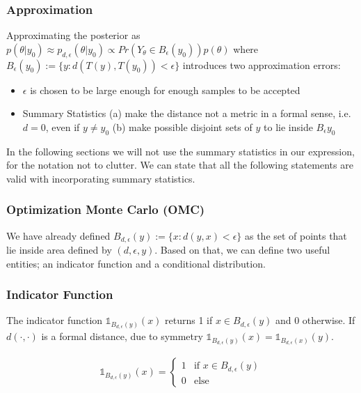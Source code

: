 \subsubsection{Approximation}

Approximating the posterior as $p(\theta|y_0) \approx p_{d,\epsilon}(\theta|y_0) \propto Pr(Y_\theta \in B_\epsilon(y_0))p(\theta)$ where $B_\epsilon(y_0) := \{y: d(T(y), T(y_0)) < \epsilon \}$ introduces two approximation errors:

\begin{itemize}
\item $\epsilon$ is chosen to be large enough for enough samples to be accepted
  \item Summary Statistics (a) make the distance not a metric in a formal sense, i.e. $d = 0$, even if $y \neq y_0$ (b) make possible disjoint sets of $y$ to lie inside $B_\epsilon{y_0}$
  \end{itemize}

  In the following sections we will not use the summary statistics in our expression, for the notation not to clutter. We can state that all the following statements are valid with incorporating summary statistics.
  
  \subsubsection{Optimization Monte Carlo (OMC)}

  We have already defined $B_{d,\epsilon}(y) := \{x: d(y,x)<\epsilon\}$ as the set of points that lie inside area defined by $(d, \epsilon, y)$. Based on that, we can define two useful entities; an indicator function and a conditional distribution.

  \subsubsection*{Indicator Function}

The indicator function $\mathbb{1}_{B_{d,\epsilon}(y)}(x)$ returns 1 if $x \in B_{d,\epsilon}(y)$ and 0 otherwise. If $d(\cdot,\cdot)$ is a formal distance, due to symmetry $\mathbb{1}_{B_{d,\epsilon}(y)}(x) = \mathbb{1}_{B_{d,\epsilon}(x)}(y)$.

\begin{gather} \label{eq:indicator}
  \mathbb{1}_{B_{d,\epsilon}(y)}(x) = \left\{
	\begin{array}{ll}
		1 & \mbox{if } x \in B_{d,\epsilon}(y) \\
		0 & \mbox{else } 
	\end{array} \right. \end{gather}

